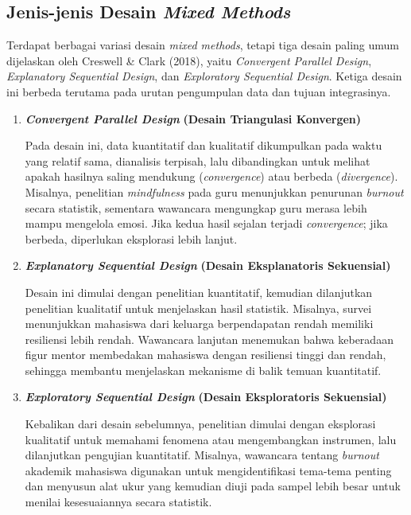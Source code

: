 \documentclass[
  indonesian,
  letterpaper,
  DIV=11,
  numbers=noendperiod]{scrreprt}
\begin{document}
\subsection{\texorpdfstring{Jenis-jenis Desain \emph{Mixed
Methods}}{Jenis-jenis Desain Mixed Methods}}\label{jenis-jenis-desain-mixed-methods}

Terdapat berbagai variasi desain \emph{mixed methods}, tetapi tiga
desain paling umum dijelaskan oleh Creswell \& Clark (2018), yaitu
\emph{Convergent Parallel Design}, \emph{Explanatory Sequential Design},
dan \emph{Exploratory Sequential Design}. Ketiga desain ini berbeda
terutama pada urutan pengumpulan data dan tujuan integrasinya.

\begin{enumerate}
\def\labelenumi{\arabic{enumi}.}
\item
  \textbf{\emph{Convergent Parallel Design}} \textbf{(Desain Triangulasi
  Konvergen)}

  Pada desain ini, data kuantitatif dan kualitatif dikumpulkan pada
  waktu yang relatif sama, dianalisis terpisah, lalu dibandingkan untuk
  melihat apakah hasilnya saling mendukung (\emph{convergence}) atau
  berbeda (\emph{divergence}). Misalnya, penelitian \emph{mindfulness}
  pada guru menunjukkan penurunan \emph{burnout} secara statistik,
  sementara wawancara mengungkap guru merasa lebih mampu mengelola
  emosi. Jika kedua hasil sejalan terjadi \emph{convergence}; jika
  berbeda, diperlukan eksplorasi lebih lanjut.
\item
  \textbf{\emph{Explanatory Sequential Design}} \textbf{(Desain
  Eksplanatoris Sekuensial)}

  Desain ini dimulai dengan penelitian kuantitatif, kemudian dilanjutkan
  penelitian kualitatif untuk menjelaskan hasil statistik. Misalnya,
  survei menunjukkan mahasiswa dari keluarga berpendapatan rendah
  memiliki resiliensi lebih rendah. Wawancara lanjutan menemukan bahwa
  keberadaan figur mentor membedakan mahasiswa dengan resiliensi tinggi
  dan rendah, sehingga membantu menjelaskan mekanisme di balik temuan
  kuantitatif.
\item
  \textbf{\emph{Exploratory Sequential Design}} \textbf{(Desain
  Eksploratoris Sekuensial)}

  Kebalikan dari desain sebelumnya, penelitian dimulai dengan eksplorasi
  kualitatif untuk memahami fenomena atau mengembangkan instrumen, lalu
  dilanjutkan pengujian kuantitatif. Misalnya, wawancara tentang
  \emph{burnout} akademik mahasiswa digunakan untuk mengidentifikasi
  tema-tema penting dan menyusun alat ukur yang kemudian diuji pada
  sampel lebih besar untuk menilai kesesuaiannya secara statistik.
\end{enumerate}
\end{document}
